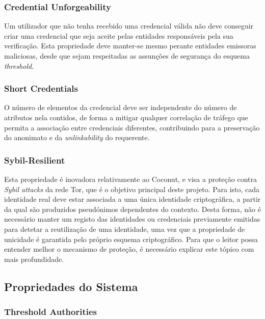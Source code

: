 \subsubsection{Credential Unforgeability}

Um utilizador que não tenha recebido uma credencial válida não deve conseguir criar uma credencial que seja aceite pelas entidades responsáveis pela sua verificação. Esta propriedade deve manter-se mesmo perante entidades emissoras maliciosas, desde que sejam respeitadas as assunções de segurança do esquema \textit{threshold}.

\subsubsection{Short Credentials}

O número de elementos da credencial deve ser independente do número de atributos nela contidos, de forma a mitigar qualquer correlação de tráfego que permita a associação entre credenciais diferentes, contribuindo para a preservação do anonimato e da \textit{unlinkability} do requerente.

\subsubsection{Sybil-Resilient}

Esta propriedade é inovadora relativamente ao Coconut, e visa a proteção contra \textit{Sybil attacks} da rede Tor, que é o objetivo principal deste projeto. Para isto, cada identidade real deve estar associada a uma única identidade criptográfica, a partir da qual são produzidos pseudónimos dependentes do contexto. Desta forma, não é necessário manter um registo das identidades ou credenciais previamente emitidas para detetar a reutilização de uma identidade, uma vez que a propriedade de unicidade é garantida pelo próprio esquema criptográfico. Para que o leitor possa entender melhor o mecanismo de proteção, é necessário explicar este tópico com mais profundidade.

\subsection{Propriedades do Sistema}
\label{sub:dittor_propriedades_sistema}

\subsubsection{Threshold Authorities}

